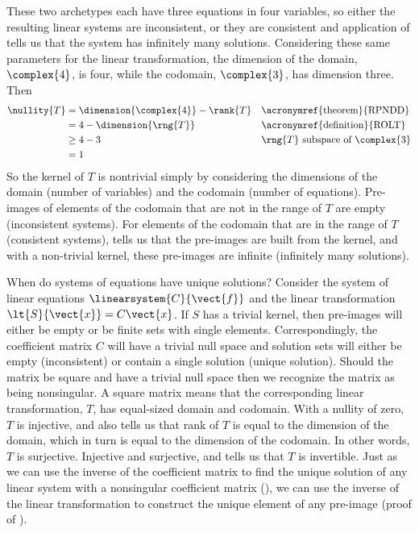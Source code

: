 %
These two archetypes each have three equations in four variables, so either the resulting linear systems are inconsistent, or they are consistent and application of  tells us that the system has infinitely many solutions.  Considering these same parameters for the linear transformation, the dimension of the domain, $\complex{4}$, is four, while the codomain, $\complex{3}$, has dimension three.  Then
%
\begin{align*}
\nullity{T}&=\dimension{\complex{4}}-\rank{T}&&\text{\acronymref{theorem}{RPNDD}}\\
&=4-\dimension{\rng{T}}&&\text{\acronymref{definition}{ROLT}}\\
&\geq 4-3&&\text{$\rng{T}$ subspace of $\complex{3}$}\\
&=1
\end{align*}
%
So the kernel of $T$ is nontrivial simply by considering the dimensions of the domain (number of variables) and the codomain (number of equations).  Pre-images of elements of the codomain that are not in the range of $T$ are empty (inconsistent systems).  For elements of the codomain that are in the range of $T$ (consistent systems),  tells us that the pre-images are built from the kernel, and with a non-trivial kernel, these pre-images are infinite (infinitely many solutions).\par
%
When do systems of equations have unique solutions?  Consider the system of linear equations $\linearsystem{C}{\vect{f}}$ and the linear transformation $\lt{S}{\vect{x}}=C\vect{x}$.  If $S$ has a trivial kernel, then pre-images will either be empty or be finite sets with single elements.  Correspondingly, the coefficient matrix $C$ will have a trivial null space and solution sets will either be empty (inconsistent) or contain a single solution (unique solution).  Should the matrix be square and have a trivial null space then we recognize the matrix as being nonsingular.  A square matrix means that the corresponding linear transformation, $T$, has equal-sized domain and codomain.  With a nullity of zero, $T$ is injective, and also  tells us that rank of $T$ is equal to the dimension of the domain, which in turn is equal to the dimension of the codomain.  In other words, $T$ is surjective.  Injective and surjective, and  tells us that $T$ is invertible.  Just as we can use the inverse of the coefficient matrix to find the unique solution of any linear system with a nonsingular coefficient matrix (), we can use the inverse of the linear transformation to construct the unique element of any pre-image (proof of ).\par
